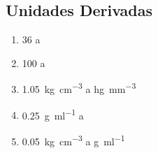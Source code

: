 \subsection{Unidades Derivadas}

\begin{exercise}
    \phantom{a}
    \begin{enumerate}[label=\letraminuscula]
        \item \qty{36}{\mps} a \unit{\kmph}
        \item \qty{100}{\kmph} a \unit{\mps}
        \item \qty{1.05}{\kilo\g\per\cubic\centi\metre} a \unit{\hecto\g\per\cubic\milli\metre}
        \item \qty{0.25}{\g\per\milli\litre} a \unit{\kilo\g\per\cubic
        \metre}
        \item \qty{0.05}{\kilo\g\per\cubic\centi\metre} a \unit{\g\per\milli\litre}
    \end{enumerate}
\end{exercise}



